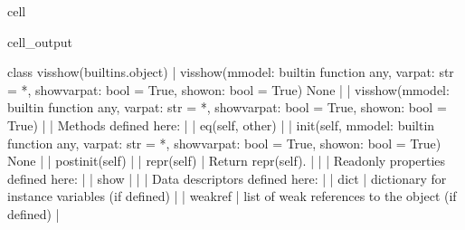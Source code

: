 \documentclass[letterpaper,10pt,english]{jupyterBook}
\begin{document}
\begin{sphinxuseclass}{cell}
\begin{sphinxVerbatimOutput}
\begin{sphinxuseclass}{cell_output}
\begin{sphinxVerbatim}[commandchars=\\\{\}]
    class visshow(builtins.object)
     |  visshow(mmodel: \PYGZlt{}built\PYGZhy{}in function any\PYGZgt{}, varpat: str = \PYGZsq{}*\PYGZsq{}, showvarpat: bool = True, show\PYGZus{}on: bool = True) \PYGZhy{}\PYGZgt{} None
     |  
     |  visshow(mmodel: \PYGZlt{}built\PYGZhy{}in function any\PYGZgt{}, varpat: str = \PYGZsq{}*\PYGZsq{}, showvarpat: bool = True, show\PYGZus{}on: bool = True)
     |  
     |  Methods defined here:
     |  
     |  \PYGZus{}\PYGZus{}eq\PYGZus{}\PYGZus{}(self, other)
     |  
     |  \PYGZus{}\PYGZus{}init\PYGZus{}\PYGZus{}(self, mmodel: \PYGZlt{}built\PYGZhy{}in function any\PYGZgt{}, varpat: str = \PYGZsq{}*\PYGZsq{}, showvarpat: bool = True, show\PYGZus{}on: bool = True) \PYGZhy{}\PYGZgt{} None
     |  
     |  \PYGZus{}\PYGZus{}post\PYGZus{}init\PYGZus{}\PYGZus{}(self)
     |  
     |  \PYGZus{}\PYGZus{}repr\PYGZus{}\PYGZus{}(self)
     |      Return repr(self).
     |  
     |  \PYGZhy{}\PYGZhy{}\PYGZhy{}\PYGZhy{}\PYGZhy{}\PYGZhy{}\PYGZhy{}\PYGZhy{}\PYGZhy{}\PYGZhy{}\PYGZhy{}\PYGZhy{}\PYGZhy{}\PYGZhy{}\PYGZhy{}\PYGZhy{}\PYGZhy{}\PYGZhy{}\PYGZhy{}\PYGZhy{}\PYGZhy{}\PYGZhy{}\PYGZhy{}\PYGZhy{}\PYGZhy{}\PYGZhy{}\PYGZhy{}\PYGZhy{}\PYGZhy{}\PYGZhy{}\PYGZhy{}\PYGZhy{}\PYGZhy{}\PYGZhy{}\PYGZhy{}\PYGZhy{}\PYGZhy{}\PYGZhy{}\PYGZhy{}\PYGZhy{}\PYGZhy{}\PYGZhy{}\PYGZhy{}\PYGZhy{}\PYGZhy{}\PYGZhy{}\PYGZhy{}\PYGZhy{}\PYGZhy{}\PYGZhy{}\PYGZhy{}\PYGZhy{}\PYGZhy{}\PYGZhy{}\PYGZhy{}\PYGZhy{}\PYGZhy{}\PYGZhy{}\PYGZhy{}\PYGZhy{}\PYGZhy{}\PYGZhy{}\PYGZhy{}\PYGZhy{}\PYGZhy{}\PYGZhy{}\PYGZhy{}\PYGZhy{}\PYGZhy{}\PYGZhy{}
     |  Readonly properties defined here:
     |  
     |  show
     |  
     |  \PYGZhy{}\PYGZhy{}\PYGZhy{}\PYGZhy{}\PYGZhy{}\PYGZhy{}\PYGZhy{}\PYGZhy{}\PYGZhy{}\PYGZhy{}\PYGZhy{}\PYGZhy{}\PYGZhy{}\PYGZhy{}\PYGZhy{}\PYGZhy{}\PYGZhy{}\PYGZhy{}\PYGZhy{}\PYGZhy{}\PYGZhy{}\PYGZhy{}\PYGZhy{}\PYGZhy{}\PYGZhy{}\PYGZhy{}\PYGZhy{}\PYGZhy{}\PYGZhy{}\PYGZhy{}\PYGZhy{}\PYGZhy{}\PYGZhy{}\PYGZhy{}\PYGZhy{}\PYGZhy{}\PYGZhy{}\PYGZhy{}\PYGZhy{}\PYGZhy{}\PYGZhy{}\PYGZhy{}\PYGZhy{}\PYGZhy{}\PYGZhy{}\PYGZhy{}\PYGZhy{}\PYGZhy{}\PYGZhy{}\PYGZhy{}\PYGZhy{}\PYGZhy{}\PYGZhy{}\PYGZhy{}\PYGZhy{}\PYGZhy{}\PYGZhy{}\PYGZhy{}\PYGZhy{}\PYGZhy{}\PYGZhy{}\PYGZhy{}\PYGZhy{}\PYGZhy{}\PYGZhy{}\PYGZhy{}\PYGZhy{}\PYGZhy{}\PYGZhy{}\PYGZhy{}
     |  Data descriptors defined here:
     |  
     |  \PYGZus{}\PYGZus{}dict\PYGZus{}\PYGZus{}
     |      dictionary for instance variables (if defined)
     |  
     |  \PYGZus{}\PYGZus{}weakref\PYGZus{}\PYGZus{}
     |      list of weak references to the object (if defined)
     |  

\end{sphinxVerbatim}
\end{sphinxuseclass}
\end{sphinxVerbatimOutput}
\end{sphinxuseclass}
\end{document}
